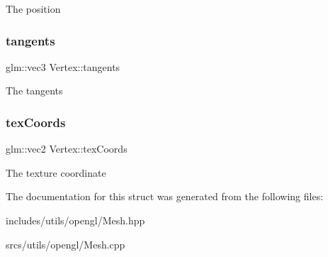 The position \mbox{\label{struct_vertex_a6e4be15c8c306b7dcd3e3d7eb1cd6b48}} 
\subsubsection{\texorpdfstring{tangents}{tangents}}
{\footnotesize\ttfamily glm\+::vec3 Vertex\+::tangents}

The tangents \mbox{\label{struct_vertex_a8d5babcf0ee1f315dae1207c375759a4}} 
\subsubsection{\texorpdfstring{tex\+Coords}{texCoords}}
{\footnotesize\ttfamily glm\+::vec2 Vertex\+::tex\+Coords}

The texture coordinate 

The documentation for this struct was generated from the following files\+:\begin{DoxyCompactItemize}
\item 
includes/utils/opengl/Mesh.\+hpp\item 
srcs/utils/opengl/Mesh.\+cpp\end{DoxyCompactItemize}
